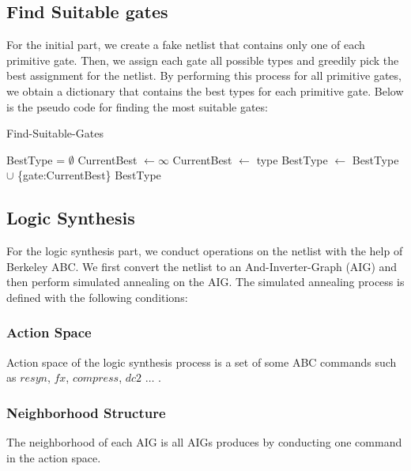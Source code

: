 \documentclass[conference]{IEEEtran}
\begin{document}
\subsection{Find Suitable gates}

For the initial part, we create a fake netlist that contains only one of each primitive gate. Then, we assign each gate all possible types and greedily pick the best assignment for the netlist. By performing this process for all primitive gates, we obtain a dictionary that contains the best types for each primitive gate. Below is the pseudo code for finding the most suitable gates:

\begin{algorithm}
\begin{algorithmic}[1]
    \caption{Find-Suitable-Gates}\label{euclid}
    \State BestType = $\emptyset $
    \State CurrentBest $\gets \infty$ 
                \State CurrentBest $\gets$ type
            \EndIf
        \EndFor
        \State BestType $\gets $ BestType $\cup $ \{gate:CurrentBest\}
    \EndFor
    \State \Return BestType
\end{algorithmic}
\end{algorithm}

\subsection{Logic Synthesis}

For the logic synthesis part, we conduct operations on the netlist with the help of Berkeley ABC. We first convert the netlist to an And-Inverter-Graph (AIG) and then perform simulated annealing on the AIG. The simulated annealing process is defined with the following conditions:

\subsubsection{Action Space}

Action space of the logic synthesis process is a set of some ABC commands such as $resyn$, $fx$, $compress$, $dc2$ $\dots$ .

\subsubsection{Neighborhood Structure}

The neighborhood of each AIG is all AIGs produces by conducting one command in the action space.
\end{document}
